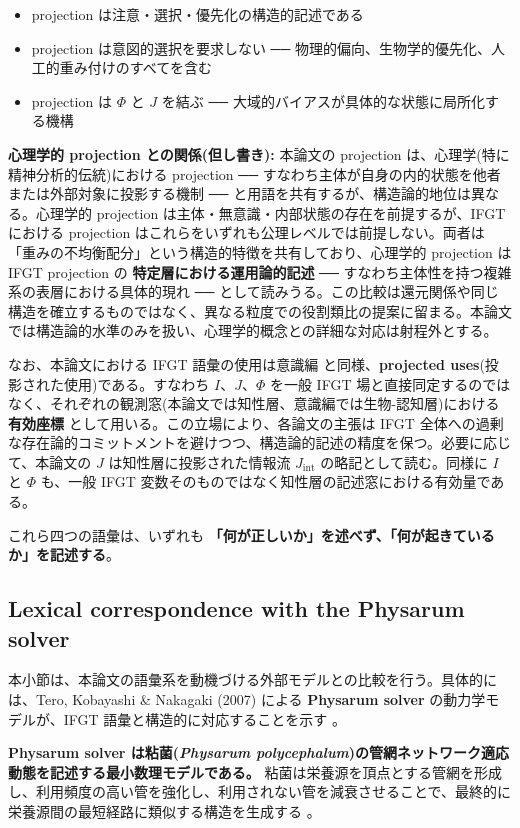 \begin{itemize}
\item projection は注意・選択・優先化の構造的記述である
\item projection は意図的選択を要求しない ── 物理的偏向、生物学的優先化、人工的重み付けのすべてを含む
\item projection は $\Phi$ と $J$ を結ぶ ── 大域的バイアスが具体的な状態に局所化する機構
\end{itemize}

\textbf{心理学的 projection との関係(但し書き):}
本論文の projection は、心理学(特に精神分析的伝統)における projection ── すなわち主体が自身の内的状態を他者または外部対象に投影する機制 ── と用語を共有するが、構造論的地位は異なる。心理学的 projection は主体・無意識・内部状態の存在を前提するが、IFGT における projection はこれらをいずれも公理レベルでは前提しない。両者は「重みの不均衡配分」という構造的特徴を共有しており、心理学的 projection は IFGT projection の \textbf{特定層における運用論的記述} ── すなわち主体性を持つ複雑系の表層における具体的現れ ── として読みうる。この比較は還元関係や同じ構造を確立するものではなく、異なる粒度での役割類比の提案に留まる。本論文では構造論的水準のみを扱い、心理学的概念との詳細な対応は射程外とする。

なお、本論文における IFGT 語彙の使用は意識編 \citep{Consciousness} と同様、\textbf{projected uses}(投影された使用)である。すなわち $I$、$J$、$\Phi$ を一般 IFGT 場と直接同定するのではなく、それぞれの観測窓(本論文では知性層、意識編では生物-認知層)における \textbf{有効座標} として用いる。この立場により、各論文の主張は IFGT 全体への過剰な存在論的コミットメントを避けつつ、構造論的記述の精度を保つ。必要に応じて、本論文の $J$ は知性層に投影された情報流 $J_{\mathrm{int}}$ の略記として読む。同様に $I$ と $\Phi$ も、一般 IFGT 変数そのものではなく知性層の記述窓における有効量である。

これら四つの語彙は、いずれも \textbf{「何が正しいか」を述べず、「何が起きているか」を記述する}。

\subsection{Lexical correspondence with the Physarum solver}


本小節は、本論文の語彙系を動機づける外部モデルとの比較を行う。具体的には、Tero, Kobayashi \& Nakagaki (2007) による \textbf{Physarum solver} の動力学モデルが、IFGT 語彙と構造的に対応することを示す \citep{Tero2007}。

\textbf{Physarum solver は粘菌(\emph{Physarum polycephalum})の管網ネットワーク適応動態を記述する最小数理モデルである。} 粘菌は栄養源を頂点とする管網を形成し、利用頻度の高い管を強化し、利用されない管を減衰させることで、最終的に栄養源間の最短経路に類似する構造を生成する \citep{Nakagaki2000}。

